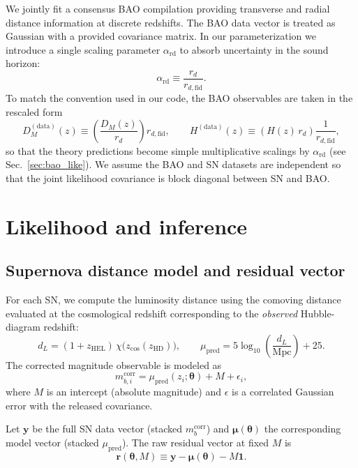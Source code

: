 \documentclass[10pt]{article}
\newcommand{\zcos}{z_{\mathrm{cos}}}
\newcommand{\zhel}{z_{\mathrm{HEL}}}
\newcommand{\zhd}{z_{\mathrm{HD}}}
\newcommand{\chis}{\chi}
\newcommand{\Mpc}{\mathrm{Mpc}}
\begin{document}
We jointly fit a consensus BAO compilation providing transverse and radial distance information at discrete redshifts.
The BAO data vector is treated as Gaussian with a provided covariance matrix. In our parameterization we introduce a single scaling parameter $\alpha_{\mathrm{rd}}$ to absorb uncertainty in the sound horizon:
\begin{equation}
\alpha_{\mathrm{rd}} \equiv \frac{r_d}{r_{d,\mathrm{fid}}}.
\end{equation}
To match the convention used in our code, the BAO observables are taken in the rescaled form
\begin{equation}
D_M^{(\mathrm{data})}(z) \equiv \left(\frac{D_M(z)}{r_d}\right) r_{d,\mathrm{fid}},
\qquad
H^{(\mathrm{data})}(z) \equiv \left(H(z)\,r_d\right)\frac{1}{r_{d,\mathrm{fid}}},
\end{equation}
so that the theory predictions become simple multiplicative scalings by $\alpha_{\mathrm{rd}}$ (see Sec.~\ref{sec:bao_like}).
We assume the BAO and SN datasets are independent so that the joint likelihood covariance is block diagonal between SN and BAO.
\section{Likelihood and inference}
\label{sec:likelihood}

\subsection{Supernova distance model and residual vector}
\label{sec:sn_model}

For each SN, we compute the luminosity distance using the comoving distance evaluated at the cosmological redshift corresponding to the \emph{observed} Hubble-diagram redshift:
\begin{equation}
d_L = (1+\zhel)\,\chis\!\bigl(\zcos(\zhd)\bigr),
\qquad
\mu_{\mathrm{pred}} = 5\log_{10}\!\left(\frac{d_L}{\Mpc}\right) + 25.
\label{eq:mu_pred}
\end{equation}
The corrected magnitude observable is modeled as
\begin{equation}
m_{b,i}^{\mathrm{corr}} = \mu_{\mathrm{pred}}(z_i;\bm{\theta}) + M + \epsilon_i,
\end{equation}
where $M$ is an intercept (absolute magnitude) and $\epsilon$ is a correlated Gaussian error with the released covariance.

Let $\bm{y}$ be the full SN data vector (stacked $m_b^{\mathrm{corr}}$) and $\bm{\mu}(\bm{\theta})$ the corresponding model vector (stacked $\mu_{\mathrm{pred}}$). The raw residual vector at fixed $M$ is
\begin{equation}
\bm{r}(\bm{\theta},M) \equiv \bm{y} - \bm{\mu}(\bm{\theta}) - M\bm{1}.
\label{eq:r_full}
\end{equation}
\end{document}

